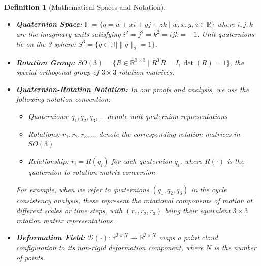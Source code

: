 \documentclass[journal]{IEEEtran}
\theoremstyle{plain}
\newtheorem{definition}{Definition}
\begin{document}
\begin{definition}[Mathematical Spaces and Notation]~\\
\begin{itemize}
    \item \textbf{Quaternion Space:} $\mathbb{H} = \{q = w + xi + yj + zk \mid w,x,y,z \in \mathbb{R}\}$ where $i, j, k$ are the imaginary units satisfying $i^2 = j^2 = k^2 = ijk = -1$. Unit quaternions lie on the 3-sphere: $S^3 = \{q \in \mathbb{H} \mid \|q\|_2 = 1\}$.

    \item \textbf{Rotation Group:} $SO(3) = \{R \in \mathbb{R}^{3\times3} \mid R^TR = I, \det(R) = 1\}$, the special orthogonal group of $3 \times 3$ rotation matrices.

    \item \textbf{Quaternion-Rotation Notation:} In our proofs and analysis, we use the following notation convention:
    \begin{itemize}
        \item Quaternions: $q_1, q_2, q_3, \ldots$ denote unit quaternion representations
        \item Rotations: $r_1, r_2, r_3, \ldots$ denote the corresponding rotation matrices in $SO(3)$
        \item Relationship: $r_i = R(q_i)$ for each quaternion $q_i$, where $R(\cdot)$ is the quaternion-to-rotation-matrix conversion
    \end{itemize}
    For example, when we refer to quaternions $(q_1, q_2, q_3)$ in the cycle consistency analysis, these represent the rotational components of motion at different scales or time steps, with $(r_1, r_2, r_3)$ being their equivalent $3 \times 3$ rotation matrix representations.

    \item \textbf{Deformation Field:} $\mathcal{D}(\cdot): \mathbb{R}^{3 \times N} \to \mathbb{R}^{3 \times N}$ maps a point cloud configuration to its non-rigid deformation component, where $N$ is the number of points.
\end{itemize}
\end{definition}
\end{document}

